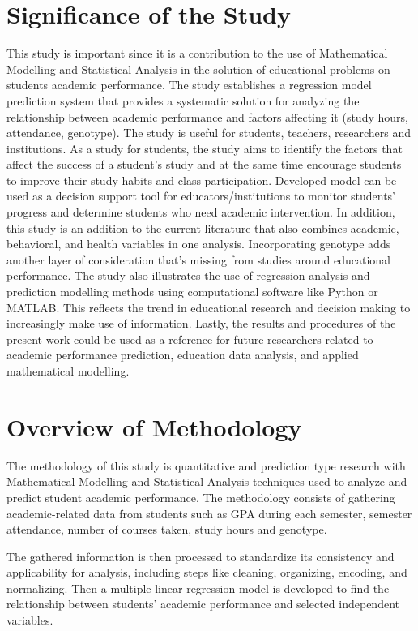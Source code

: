 \documentclass[12pt]{report}
\begin{document}
	\section{Significance of the Study}
	This study is important since it is a contribution to the use of Mathematical Modelling and Statistical Analysis in the solution of educational problems on students academic performance. The study establishes a regression model prediction system that provides a systematic solution for analyzing the relationship between academic performance and factors affecting it (study hours, attendance, genotype).
	The study is useful for students, teachers, researchers and institutions. As a study for students, the study aims to identify the factors that affect the success of a student's study and at the same time encourage students to improve their study habits and class participation. Developed model can be used as a decision support tool for educators/institutions to monitor students' progress and determine students who need academic intervention.
	In addition, this study is an addition to the current literature that also combines academic, behavioral, and health variables in one analysis. Incorporating genotype adds another layer of consideration that's missing from studies around educational performance.
	The study also illustrates the use of regression analysis and prediction modelling methods using computational software like Python or MATLAB. This reflects the trend in educational research and decision making to increasingly make use of information.
	Lastly, the results and procedures of the present work could be used as a reference for future researchers related to academic performance prediction, education data analysis, and applied mathematical modelling.
	\section{Overview of Methodology}
	The methodology of this study is quantitative and prediction type research with Mathematical Modelling and Statistical Analysis techniques used to analyze and predict student academic performance. The methodology consists of gathering academic-related data from students such as GPA during each semester, semester attendance, number of courses taken, study hours and genotype.
	
	The gathered information is then processed to standardize its consistency and applicability for analysis, including steps like cleaning, organizing, encoding, and normalizing. Then a multiple linear regression model is developed to find the relationship between students' academic performance and selected independent variables.
	
\end{document}
